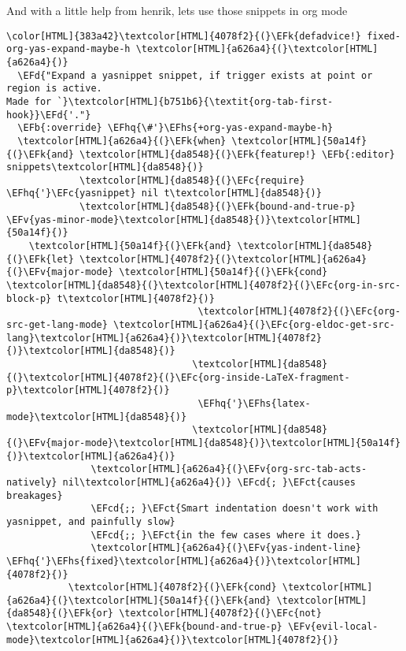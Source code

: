 \documentclass{scrartcl}
\newcommand{\EFk}[1]{\textcolor{EFk}{#1}} %
\newcommand{\EFd}[1]{\textcolor{EFd}{\textit{#1}}} %
\newcommand{\EFb}[1]{\textcolor{EFb}{#1}} %
\newcommand{\EFct}[1]{\textcolor{EFct}{#1}} %
\newcommand{\EFc}[1]{\textcolor{EFc}{#1}} %
\newcommand{\EFv}[1]{\textcolor{EFv}{#1}} %
\newcommand{\EFcd}[1]{\textcolor{EFcd}{#1}} %
\newcommand{\EFhq}[1]{\textcolor{EFhq}{#1}} %
\newcommand{\EFhs}[1]{\textcolor{EFhs}{#1}} %
\begin{document}
And with a little help from henrik, lets use those snippets in org mode
\begin{Code}
\begin{Verbatim}[]
\color[HTML]{383a42}\textcolor[HTML]{4078f2}{(}\EFk{defadvice!} fixed-org-yas-expand-maybe-h \textcolor[HTML]{a626a4}{(}\textcolor[HTML]{a626a4}{)}
  \EFd{"Expand a yasnippet snippet, if trigger exists at point or region is active.
Made for `}\textcolor[HTML]{b751b6}{\textit{org-tab-first-hook}}\EFd{'."}
  \EFb{:override} \EFhq{\#'}\EFhs{+org-yas-expand-maybe-h}
  \textcolor[HTML]{a626a4}{(}\EFk{when} \textcolor[HTML]{50a14f}{(}\EFk{and} \textcolor[HTML]{da8548}{(}\EFk{featurep!} \EFb{:editor} snippets\textcolor[HTML]{da8548}{)}
             \textcolor[HTML]{da8548}{(}\EFc{require} \EFhq{'}\EFc{yasnippet} nil t\textcolor[HTML]{da8548}{)}
             \textcolor[HTML]{da8548}{(}\EFk{bound-and-true-p} \EFv{yas-minor-mode}\textcolor[HTML]{da8548}{)}\textcolor[HTML]{50a14f}{)}
    \textcolor[HTML]{50a14f}{(}\EFk{and} \textcolor[HTML]{da8548}{(}\EFk{let} \textcolor[HTML]{4078f2}{(}\textcolor[HTML]{a626a4}{(}\EFv{major-mode} \textcolor[HTML]{50a14f}{(}\EFk{cond} \textcolor[HTML]{da8548}{(}\textcolor[HTML]{4078f2}{(}\EFc{org-in-src-block-p} t\textcolor[HTML]{4078f2}{)}
                                  \textcolor[HTML]{4078f2}{(}\EFc{org-src-get-lang-mode} \textcolor[HTML]{a626a4}{(}\EFc{org-eldoc-get-src-lang}\textcolor[HTML]{a626a4}{)}\textcolor[HTML]{4078f2}{)}\textcolor[HTML]{da8548}{)}
                                 \textcolor[HTML]{da8548}{(}\textcolor[HTML]{4078f2}{(}\EFc{org-inside-LaTeX-fragment-p}\textcolor[HTML]{4078f2}{)}
                                  \EFhq{'}\EFhs{latex-mode}\textcolor[HTML]{da8548}{)}
                                 \textcolor[HTML]{da8548}{(}\EFv{major-mode}\textcolor[HTML]{da8548}{)}\textcolor[HTML]{50a14f}{)}\textcolor[HTML]{a626a4}{)}
               \textcolor[HTML]{a626a4}{(}\EFv{org-src-tab-acts-natively} nil\textcolor[HTML]{a626a4}{)} \EFcd{; }\EFct{causes breakages}
               \EFcd{;; }\EFct{Smart indentation doesn't work with yasnippet, and painfully slow}
               \EFcd{;; }\EFct{in the few cases where it does.}
               \textcolor[HTML]{a626a4}{(}\EFv{yas-indent-line} \EFhq{'}\EFhs{fixed}\textcolor[HTML]{a626a4}{)}\textcolor[HTML]{4078f2}{)}
           \textcolor[HTML]{4078f2}{(}\EFk{cond} \textcolor[HTML]{a626a4}{(}\textcolor[HTML]{50a14f}{(}\EFk{and} \textcolor[HTML]{da8548}{(}\EFk{or} \textcolor[HTML]{4078f2}{(}\EFc{not} \textcolor[HTML]{a626a4}{(}\EFk{bound-and-true-p} \EFv{evil-local-mode}\textcolor[HTML]{a626a4}{)}\textcolor[HTML]{4078f2}{)}

\end{Verbatim}
\end{Code}
\end{document}
